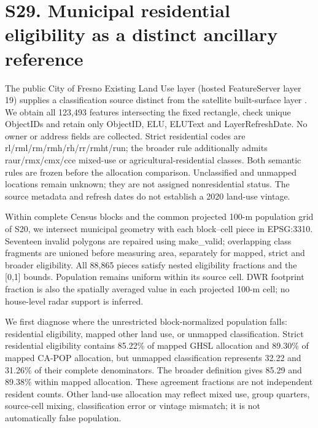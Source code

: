 \section*{S29. Municipal residential eligibility as a distinct ancillary reference}
The public City of Fresno Existing Land Use layer (hosted FeatureServer layer 19) supplies a classification source distinct from the satellite built-surface layer \citep{fresno2026landuse}. We obtain all 123,493 features intersecting the fixed rectangle, check unique ObjectIDs and retain only ObjectID, ELU, ELUText and LayerRefreshDate. No owner or address fields are collected. Strict residential codes are rl/rml/rm/rmh/rh/rr/rmht/run; the broader rule additionally admits raur/rmx/cmx/cce mixed-use or agricultural-residential classes. Both semantic rules are frozen before the allocation comparison. Unclassified and unmapped locations remain unknown; they are not assigned nonresidential status. The source metadata and refresh dates do not establish a 2020 land-use vintage.

Within complete Census blocks and the common projected 100-m population grid of S20, we intersect municipal geometry with each block--cell piece in EPSG:3310. Seventeen invalid polygons are repaired using make\_valid; overlapping class fragments are unioned before measuring area, separately for mapped, strict and broader eligibility. All 88,865 pieces satisfy nested eligibility fractions and the [0,1] bounds. Population remains uniform within its source cell. DWR footprint fraction is also the spatially averaged value in each projected 100-m cell; no house-level radar support is inferred.

We first diagnose where the unrestricted block-normalized population falls: residential eligibility, mapped other land use, or unmapped classification. Strict residential eligibility contains 85.22\% of mapped GHSL allocation and 89.30\% of mapped CA-POP allocation, but unmapped classification represents 32.22 and 31.26\% of their complete denominators. The broader definition gives 85.29 and 89.38\% within mapped allocation. These agreement fractions are not independent resident counts. Other land-use allocation may reflect mixed use, group quarters, source-cell mixing, classification error or vintage mismatch; it is not automatically false population.

